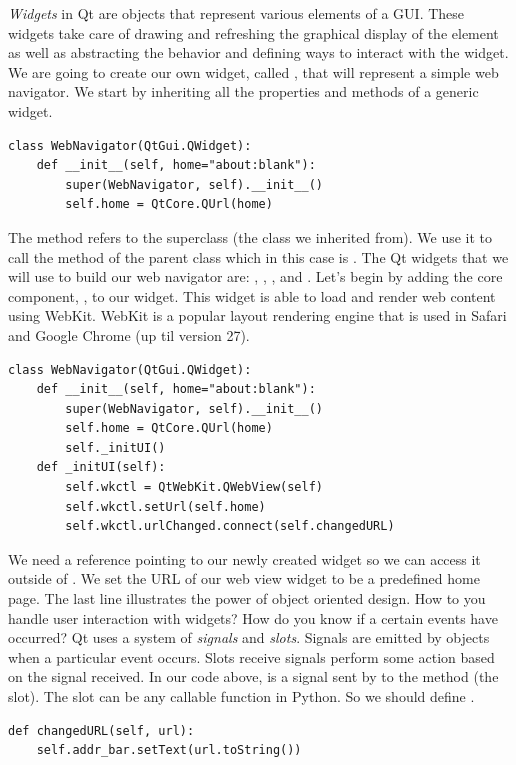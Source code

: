 \emph{Widgets} in Qt are objects that represent various elements of a GUI.
These widgets take care of drawing and refreshing the graphical display of the element as well as
abstracting the behavior and defining ways to interact with the widget.
We are going to create our own widget, called , that will represent a simple web navigator.
We start by inheriting all the properties and methods of a generic widget.
\begin{lstlisting}
class WebNavigator(QtGui.QWidget):
    def __init__(self, home="about:blank"):
        super(WebNavigator, self).__init__()
        self.home = QtCore.QUrl(home)
\end{lstlisting}
The  method refers to the superclass (the class we inherited from).  We use it to call the  method of the parent class which in this case is .
The Qt widgets that we will use to build our web navigator are: , ,
, and .
Let's begin by adding the core component, , to our widget.  This widget is able to load and render web content using WebKit.  WebKit is a popular layout rendering engine that is used in Safari and Google Chrome (up til version 27).
\begin{lstlisting}
class WebNavigator(QtGui.QWidget):
    def __init__(self, home="about:blank"):
        super(WebNavigator, self).__init__()
        self.home = QtCore.QUrl(home)
        self._initUI()
    def _initUI(self):
        self.wkctl = QtWebKit.QWebView(self)
        self.wkctl.setUrl(self.home)
        self.wkctl.urlChanged.connect(self.changedURL)
\end{lstlisting}
We need a reference pointing to our newly created  widget so we can access it outside of .  We set the URL of our web view widget to be a predefined home page.  
The last line illustrates the power of object oriented design.  How to you handle user interaction with widgets?  How do you know if a certain events have occurred?  Qt uses a system of \emph{signals} and \emph{slots}.  Signals are emitted by objects when a particular event occurs.  Slots receive signals perform some action based on the signal received.  In our code above,  is a signal sent by  to the method  (the slot).  The slot can be any callable function in Python.  So we should define .
\begin{lstlisting}
def changedURL(self, url):
    self.addr_bar.setText(url.toString())
\end{lstlisting}
